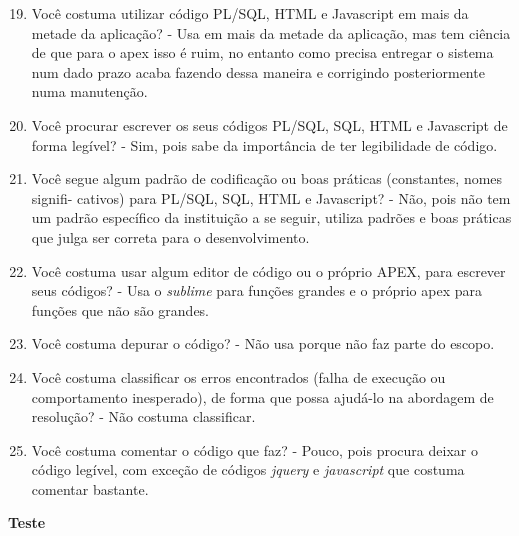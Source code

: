 \begin{anexosenv}
\begin{enumerate}
\setcounter{enumi}{18}
\item Você costuma utilizar código PL/SQL, HTML e Javascript em mais da metade da
aplicação?\newline
- Usa em mais da metade da aplicação, mas tem ciência de que para o apex isso é ruim, no entanto como precisa entregar o sistema num dado prazo acaba fazendo dessa maneira e corrigindo posteriormente numa manutenção.
\item Você procurar escrever os seus códigos PL/SQL, SQL, HTML e Javascript de forma
legível?\newline
- Sim, pois sabe da importância de ter legibilidade de código.
\item Você segue algum padrão de codificação ou boas práticas (constantes, nomes signifi-
cativos) para PL/SQL, SQL, HTML e Javascript?\newline
- Não, pois não tem um padrão específico da instituição a se seguir, utiliza padrões e boas práticas que julga ser correta para o desenvolvimento.
\item Você costuma usar algum editor de código ou o próprio APEX, para escrever seus
códigos?\newline
- Usa o \textit{sublime} para funções grandes e o próprio apex para funções que não são grandes.
\item Você costuma depurar o código?\newline
- Não usa porque não faz parte do escopo.
\item Você costuma classificar os erros encontrados (falha de execução ou comportamento
inesperado), de forma que possa ajudá-lo na abordagem de resolução?\newline
- Não costuma classificar.
\item Você costuma comentar o código que faz?\newline
- Pouco, pois procura deixar o código legível, com exceção de códigos \textit{jquery} e \textit{javascript} que costuma comentar bastante.
\end{enumerate}

\textbf{Teste}


\end{anexosenv}
